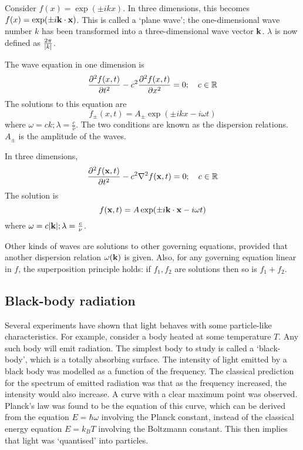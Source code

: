 Consider \( f(x) = \exp(\pm i k x) \).
In three dimensions, this becomes \( f(x) = \exp(\pm i \vb k \cdot \vb x) \).
This is called a `plane wave'; the one-dimensional wave number \( k \) has been transformed into a three-dimensional wave vector \( \vb k \).
\( \lambda \) is now defined as \( \frac{2\pi}{\abs{k}} \).

The wave equation in one dimension is
\[
	\pdv[2]{f(x,t)}{t} - c^2 \pdv[2]{f(x,t)}{x} = 0;\quad c \in \mathbb R
\]
The solutions to this equation are
\[
	f_\pm (x,t) = A_\pm \exp(\pm i k x - i \omega t)
\]
where \( \omega = c k; \lambda = \frac{c}{\nu} \).
The two conditions are known as the dispersion relations.
\( A_\pm \) is the amplitude of the waves.

In three dimensions,
\[
	\pdv[2]{f(\vb x,t)}{t} - c^2 \laplacian f(\vb x,t) = 0;\quad c \in \mathbb R
\]
The solution is
\[
	f (\vb x,t) = A \exp(\pm i \vb k \cdot \vb x - i \omega t)
\]
where \( \omega = c \abs{\vb k}; \lambda = \frac{c}{\nu} \).

\begin{note}
	Other kinds of waves are solutions to other governing equations, provided that another dispersion relation \( \omega(\vb k) \) is given.
	Also, for any governing equation linear in \( f \), the superposition principle holds: if \( f_1, f_2 \) are solutions then so is \( f_1 + f_2 \).
\end{note}

\subsection{Black-body radiation}
Several experiments have shown that light behaves with some particle-like characteristics.
For example, consider a body heated at some temperature \( T \).
Any such body will emit radiation.
The simplest body to study is called a `black-body', which is a totally absorbing surface.
The intensity of light emitted by a black body was modelled as a function of the frequency.
The classical prediction for the spectrum of emitted radiation was that as the frequency increased, the intensity would also increase.
A curve with a clear maximum point was observed.
Planck's law was found to be the equation of this curve, which can be derived from the equation \( E = \hbar \omega \) involving the Planck constant, instead of the classical energy equation \( E = k_B T \) involving the Boltzmann constant.
This then implies that light was `quantised' into particles.
